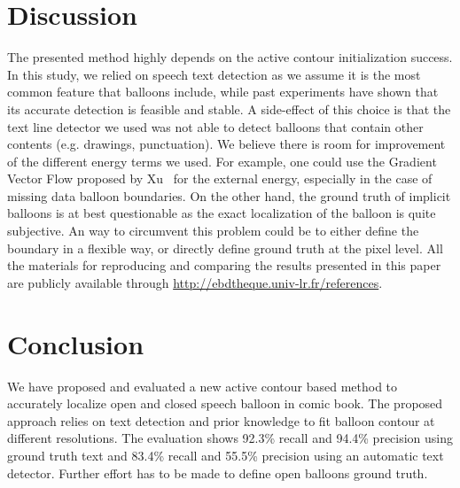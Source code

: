 \documentclass[conference]{IEEEtran}
\begin{document}
\section{Discussion}
The presented method highly depends on the active contour initialization success. In this study, we relied on speech text detection as we assume it is the most common feature that balloons include, while past experiments have shown that its accurate detection is feasible and stable. A side-effect of this choice is that the text line detector we used was not able to detect balloons that contain other contents (e.g. drawings, punctuation). %
We believe there is room for improvement of the different energy terms we used. For example, one could use the Gradient Vector Flow proposed by Xu~\cite{Xu1998} for the external energy, especially in the case of missing data balloon boundaries. %
On the other hand, the ground truth of implicit balloons is at best questionable as the exact localization of the balloon is quite subjective. An way to circumvent this problem could be to either define the boundary in a flexible way, or directly define ground truth at the pixel level.
All the materials for reproducing and comparing the results presented in this paper are publicly available through \url{http://ebdtheque.univ-lr.fr/references}.




\section{Conclusion}

We have proposed and evaluated a new active contour based method to accurately localize open and closed speech balloon in comic book. The proposed approach relies on text detection and prior knowledge to fit balloon contour at different resolutions. The evaluation shows 92.3\% recall and 94.4\% precision using ground truth text and 83.4\% recall and 55.5\% precision using an automatic text detector. Further effort has to be made to define open balloons ground truth.
\end{document}
